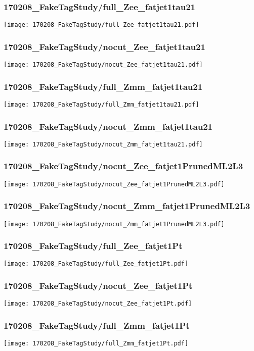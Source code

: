 \begin{frame}
   \frametitle{\small 170208\_FakeTagStudy/full\_Zee\_fatjet1tau21}
   \centering
   \texttt{[image: 170208\_FakeTagStudy/full\_Zee\_fatjet1tau21.pdf]}
\end{frame}

\begin{frame}
   \frametitle{\small 170208\_FakeTagStudy/nocut\_Zee\_fatjet1tau21}
   \centering
   \texttt{[image: 170208\_FakeTagStudy/nocut\_Zee\_fatjet1tau21.pdf]}
\end{frame}

\begin{frame}
   \frametitle{\small 170208\_FakeTagStudy/full\_Zmm\_fatjet1tau21}
   \centering
   \texttt{[image: 170208\_FakeTagStudy/full\_Zmm\_fatjet1tau21.pdf]}
\end{frame}

\begin{frame}
   \frametitle{\small 170208\_FakeTagStudy/nocut\_Zmm\_fatjet1tau21}
   \centering
   \texttt{[image: 170208\_FakeTagStudy/nocut\_Zmm\_fatjet1tau21.pdf]}
\end{frame}

\begin{frame}
   \frametitle{\small 170208\_FakeTagStudy/nocut\_Zee\_fatjet1PrunedML2L3}
   \centering
   \texttt{[image: 170208\_FakeTagStudy/nocut\_Zee\_fatjet1PrunedML2L3.pdf]}
\end{frame}

\begin{frame}
   \frametitle{\small 170208\_FakeTagStudy/nocut\_Zmm\_fatjet1PrunedML2L3}
   \centering
   \texttt{[image: 170208\_FakeTagStudy/nocut\_Zmm\_fatjet1PrunedML2L3.pdf]}
\end{frame}

\begin{frame}
   \frametitle{\small 170208\_FakeTagStudy/full\_Zee\_fatjet1Pt}
   \centering
   \texttt{[image: 170208\_FakeTagStudy/full\_Zee\_fatjet1Pt.pdf]}
\end{frame}

\begin{frame}
   \frametitle{\small 170208\_FakeTagStudy/nocut\_Zee\_fatjet1Pt}
   \centering
   \texttt{[image: 170208\_FakeTagStudy/nocut\_Zee\_fatjet1Pt.pdf]}
\end{frame}

\begin{frame}
   \frametitle{\small 170208\_FakeTagStudy/full\_Zmm\_fatjet1Pt}
   \centering
   \texttt{[image: 170208\_FakeTagStudy/full\_Zmm\_fatjet1Pt.pdf]}
\end{frame}

